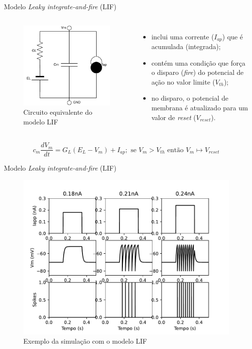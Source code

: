\begin{frame}{Modelo \textit{Leaky integrate-and-fire} (LIF)}
	\begin{columns}[t]
		\column{5cm}
			\begin{figure}[htb!]
				\centering
				\caption{Circuito equivalente do modelo LIF}
				\label{fig:circuitolif}
				\includegraphics[width=0.5\linewidth]{figs/circuito_lif}
			\end{figure}
		\column{5cm}
			\begin{itemize}
				\item inclui uma corrente ($I_{ap}$) que é acumulada (integrada);
				\item contém uma condição que força o disparo (\textit{fire}) do potencial de ação no valor limite ($V_{th}$);
				\item no disparo, o potencial de membrana é atualizado para um valor de \textit{reset} ($V_{reset}$).
			\end{itemize}
	\end{columns}
	\vfill
	\[
		c_m\frac{dV_m}{dt} = G_L(E_L-V_m)+I_{ap}; \text{ se } V_m > V_{th} \text{ então } V_m\mapsto V_{reset}
	\]
\end{frame}

\begin{frame}{Modelo \textit{Leaky integrate-and-fire} (LIF)}
	\begin{figure}
		\centering
		\caption{Exemplo da simulação com o modelo LIF}
		\label{fig:lif}
		\includegraphics[width=0.5\linewidth]{figs/lif}
	\end{figure}
\end{frame}

